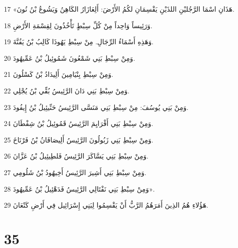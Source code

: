 \par 17 «هَذَانِ اسْمَا الرَّجُليْنِ اللذَيْنِ يَقْسِمَانِ لكُمُ الأَرْضَ: أَلِعَازَارُ الكَاهِنُ وَيَشُوعُ بْنُ نُونَ.
\par 18 وَرَئِيساً وَاحِداً مِنْ كُلِّ سِبْطٍ تَأْخُذُونَ لِقِسْمَةِ الأَرْضِ.
\par 19 وَهَذِهِ أَسْمَاءُ الرِّجَالِ. مِنْ سِبْطِ يَهُوذَا كَالِبُ بْنُ يَفُنَّةَ.
\par 20 وَمِنْ سِبْطِ بَنِي شَمْعُونَ شَمُوئِيلُ بْنُ عَمِّيهُودَ.
\par 21 وَمِنْ سِبْطِ بِنْيَامِينَ أَلِيدَادُ بْنُ كَسْلُونَ.
\par 22 وَمِنْ سِبْطِ بَنِي دَانَ الرَّئِيسُ بُقِّي بْنُ يُجْلِي.
\par 23 وَمِنْ بَنِي يُوسُفَ: مِنْ سِبْطِ بَنِي مَنَسَّى الرَّئِيسُ حَنِّيئِيلُ بْنُ إِيفُودَ.
\par 24 وَمِنْ سِبْطِ بَنِي أَفْرَايِمَ الرَّئِيسُ قَمُوئِيلُ بْنُ شِفْطَانَ.
\par 25 وَمِنْ سِبْطِ بَنِي زَبُولُونَ الرَّئِيسُ أَلِيصَافَانُ بْنُ فَرْنَاخَ.
\par 26 وَمِنْ سِبْطِ بَنِي يَسَّاكَرَ الرَّئِيسُ فَلطِيئِيلُ بْنُ عَزَّانَ.
\par 27 وَمِنْ سِبْطِ بَنِي أَشِيرَ الرَّئِيسُ أَخِيهُودُ بْنُ شَلُومِي.
\par 28 وَمِنْ سِبْطِ بَنِي نَفْتَالِي الرَّئِيسُ فَدَهْئِيلُ بْنُ عَمِّيهُودَ».
\par 29 هَؤُلاءِ هُمُ الذِينَ أَمَرَهُمُ الرَّبُّ أَنْ يَقْسِمُوا لِبَنِي إِسْرَائِيل فِي أَرْضِ كَنْعَانَ.

\chapter{35}

